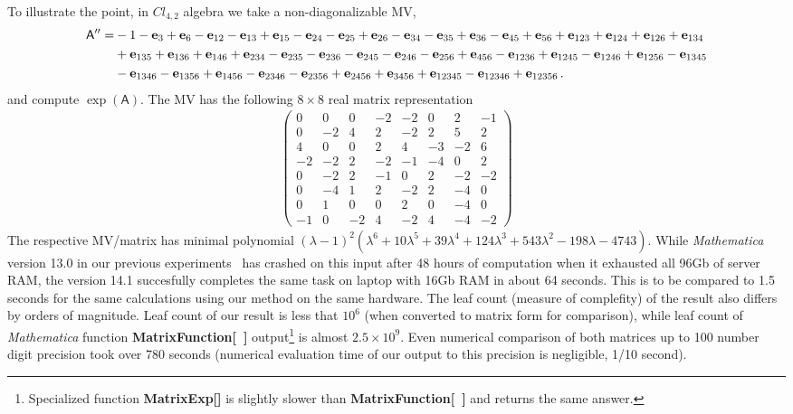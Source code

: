 \documentclass[AMA,STIX1COL]{WileyNJD-v2}
\def\m#1{\mathsf{#1}} %
\newcommand{\cl}[2]{\ensuremath{\mathit{Cl}_{#1,#2}}}
\def\m#1{\mathsf{#1}}%
\def\e#1{\mathbf{e}_{#1}} %
\begin{document}
\begin{eexample}
 To illustrate the point, in $\cl{4}{2}$ algebra we take a
 non-diagonalizable MV,
 \begin{align}
   \m{A}^{\prime\prime}=&
-1-\e{3}+\e{6}-\e{12}-\e{13}+\e{15}-\e{24}-\e{25}+\e{26}-\e{34}-\e{35}+\e{36}-\e{45}+\e{56}+\e{123}+\e{124}+\e{126}+\e{134}\notag\\
   &+\e{135}+\e{136}+\e{146}+\e{234}-\e{235}-\e{236}-\e{245}-\e{246}-\e{256}+\e{456}
-\e{1236}+\e{1245}-\e{1246}+\e{1256}-\e{1345}\\
   &-\e{1346}-\e{1356}+\e{1456}-\e{2346}-\e{2356}+\e{2456}+\e{3456}+\e{12345}-\e{12346}+\e{12356}\,.\notag
  \end{align}
and compute $\exp(\m{A})$. 
The MV has the following $8\times 8$ real matrix representation
\begin{align}
 \left(\begin{matrix}
  0&0&0&-2&-2&0&2&-1\\
  0&-2&4&2&-2&2&5&2\\
  4&0&0&2&4&-3&-2&6\\
  -2&-2&2&-2&-1&-4&0&2\\
  0&-2&2&-1&0&2&-2&-2\\
  0&-4&1&2&-2&2&-4&0\\
  0&1&0&0&2&0&-4&0\\
  -1&0&-2&4&-2&4&-4&-2
\end{matrix}\right)
\end{align}
  The respective MV/matrix has minimal polynomial $(\lambda -1)^2 \left(\lambda ^6+10 \lambda ^5+39 \lambda
^4+124 \lambda ^3+543 \lambda ^2-198 \lambda -4743\right)$. 
  While {\it Mathematica} version 13.0 in our previous experiments~\cite{AcusMMAS2023} 
  has crashed on this input after 48 hours of computation when it exhausted all 96Gb of server RAM, the version 14.1 succesfully completes the same task on laptop with 16Gb RAM in about 64 seconds. 
  This is to be compared to 1.5 seconds for the same calculations using our method on the same hardware. The leaf count (measure of complefity) of the result also differs by orders of magnitude. Leaf count of our result is less that $10^6$ (when converted to matrix form for comparison), while  leaf count of 
\textit{Mathematica} function {\bf MatrixFunction[~]} output\footnote{Specialized function {\bf MatrixExp[]} is slightly slower than {\bf MatrixFunction[~]} and returns the same answer.} is
almost $2.5\times 10^9$. Even numerical comparison of both matrices up to 100 number digit precision took over 780 seconds
(numerical evaluation time of our output to this precision is negligible, 1/10 second). 
\end{eexample}
\end{document}
